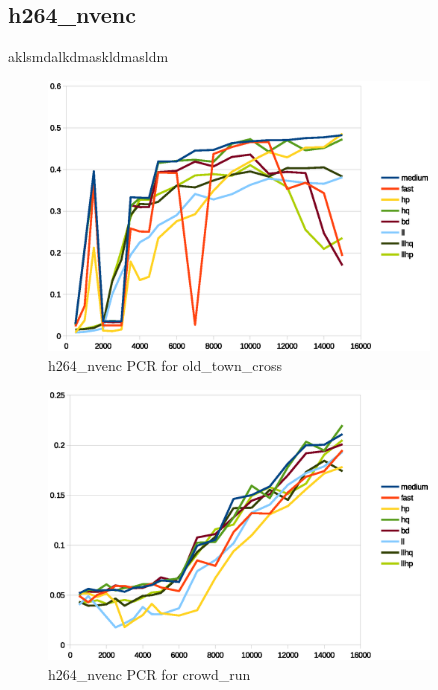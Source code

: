 \documentclass[12pt,twoside]{article}
\begin{document}
\subsection{h264\_nvenc}
aklsmdalkdmaskldmasldm
\begin{figure}[!h]
	\vspace{-10pt}
	\centering
	\includegraphics[width=0.9\textwidth]{img/h264_nvencoldtTownCrossPCR.eps}
	\caption{h264\_nvenc PCR for old\_town\_cross}
	\label{fig:h264_nvencoldtTownCrossPCR}
\end{figure}
\begin{figure}[!h]
	\vspace{-10pt}
	\centering
	\includegraphics[width=0.9\textwidth]{img/h264_nvencCrowdRunPCR.eps}
	\caption{h264\_nvenc PCR for crowd\_run}
	\label{fig:h264_nvencCrowdRunPCR}
\end{figure}
\end{document}
